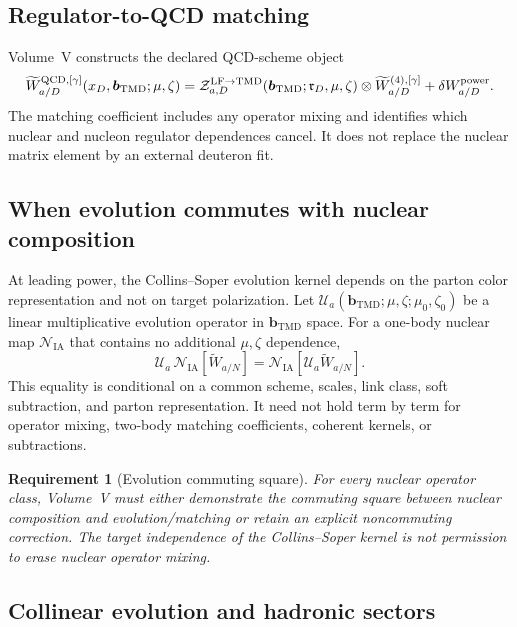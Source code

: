\documentclass[11pt]{article}
\newtheorem{requirement}[definition]{Requirement}
\newcommand{\bM}{\bm{b}_{\mathrm{TMD}}}
\newcommand{\LF}{\mathrm{LF}}
\newcommand{\TMD}{\mathrm{TMD}}
\newcommand{\QCD}{\mathrm{QCD}}
\newcommand{\cZ}{\mathcal Z}
\newcommand{\cN}{\mathcal N}
\newcommand{\cU}{\mathcal U}
\newcommand{\IA}{\mathrm{IA}}
\begin{document}
\subsection{Regulator-to-QCD matching}

Volume~V constructs the declared QCD-scheme object
\begin{equation}
 \widetilde W_{a/D}^{\QCD,[\gamma]}
 (x_D,\bM;\mu,\zeta)
 =\cZ_{a,D}^{\LF\to\TMD}
 (\bM;\mathfrak r_D,\mu,\zeta)
 \otimes
 \widetilde W_{a/D}^{(4),[\gamma]}
 +\delta W_{a/D}^{\rm power}.
\label{eq:deuteron-lf-to-tmd-matching}
\end{equation}
The matching coefficient includes any operator mixing and identifies which
nuclear and nucleon regulator dependences cancel.  It does not replace the
nuclear matrix element by an external deuteron fit.

\subsection{When evolution commutes with nuclear composition}

At leading power, the Collins--Soper evolution kernel depends on the parton
color representation and not on target polarization.  Let
\(\cU_a(\bM;\mu,\zeta;\mu_0,\zeta_0)\) be a linear multiplicative evolution
operator in \(\bM\) space.  For a one-body nuclear map \(\cN_{\IA}\) that
contains no additional \(\mu,\zeta\) dependence,
\begin{equation}
 \cU_a\,\cN_{\IA}[\widetilde W_{a/N}]
 =\cN_{\IA}[\cU_a\widetilde W_{a/N}].
\label{eq:cs-evolution-commutes-ia}
\end{equation}
This equality is conditional on a common scheme, scales, link class, soft
subtraction, and parton representation.  It need not hold term by term for
operator mixing, two-body matching coefficients, coherent kernels, or
subtractions.

\begin{requirement}[Evolution commuting square]
\label{req:evolution-commuting-square}
For every nuclear operator class, Volume~V must either demonstrate the
commuting square between nuclear composition and evolution/matching or retain
an explicit noncommuting correction.  The target independence of the
Collins--Soper kernel is not permission to erase nuclear operator mixing.
\end{requirement}

\subsection{Collinear evolution and hadronic sectors}
\end{document}
